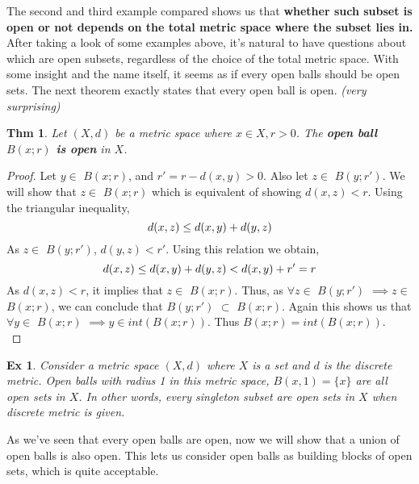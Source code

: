 \documentclass[paper=a4, fontsize=11pt]{scrartcl}
\newcommand{\ball}[2]{$B({#1};{#2})$}
\newtheorem{theorem}{Thm}
\newtheorem{example}{Ex}
\begin{document}
The second and third example compared shows us that \textbf{whether such subset is open or not depends on the total metric space where the subset lies in.} After taking a look of some examples above, it's natural to have questions about which are open subsets, regardless of the choice of the total metric space. With some insight and the name itself, it seems as if every open balls should be open sets. The next theorem exactly states that every open ball is open. \textit{(very surprising)}\\

\begin{theorem}
	Let $(X,d)$ be a metric space where $x \in X , r>0$. The \textbf{open ball \ball{x}{r} is open} in $X$.\\
\end{theorem}
\begin{proof}
	Let $ y \in$ \ball{x}{r}, and $ r' = r - d(x,y) > 0$. Also let $ z\in$ \ball{y}{r'}. We will show that $z \in$ \ball{x}{r} which is equivalent of showing $d(x,z)<r$. Using the triangular inequality,
	\begin{equation}\nonumber
		d(x,z) \leq d(x,y)+d(y,z)\\
	\end{equation}
	As $z \in$ \ball{y}{r'}, $d(y,z)<r'$. Using this relation we obtain, 
	\begin{equation}\nonumber
	d(x,z) \leq d(x,y)+d(y,z)<d(x,y)+r'=r\\
	\end{equation}
	As $d(x,z)<r$, it implies that $z\in$ \ball{x}{r}. Thus, as $\forall z\in$ \ball{y}{r'} $\implies z \in$ \ball{x}{r}, we can conclude that \ball{y}{r'} $\subset$ \ball{x}{r}. Again this shows us that $\forall y \in$ \ball{x}{r} $\implies y \in int(B(x;r))$. Thus $B(x;r)=int(B(x;r))$.\\
\end{proof}

\begin{example}
	Consider a metric space $(X,d)$ where $X$ is a set and $d$ is the discrete metric. Open balls with radius 1 in this metric space, $B(x,1)=\{x\}$ are all open sets in $X$. In other words, every singleton subset are open sets in $X$ when discrete metric is given.\\ 
\end{example}

As we've seen that every open balls are open, now we will show that a union of open balls is also open. This lets us consider open balls as building blocks of open sets, which is quite acceptable.\\
\end{document}

